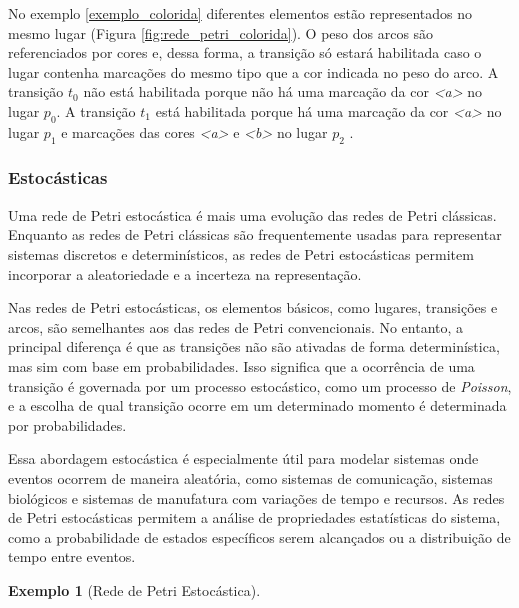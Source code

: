 \documentclass[
	12pt,				%
	openright,			%
	oneside,			%
	a4paper,			%
	english,			%
	brazil				%
	]{abntex2}
\theoremstyle{doispontos}
\newtheorem{exemplo}{Exemplo}
\begin{document}
No exemplo \ref{exemplo_colorida} diferentes elementos estão representados no mesmo lugar (Figura \ref{fig:rede_petri_colorida}). O peso dos arcos são referenciados por cores e, dessa forma, a transição só estará habilitada caso o lugar contenha marcações do mesmo tipo que a cor indicada no peso do arco. A transição $t_{0}$ não está habilitada porque não há uma marcação da cor \textit{<a>} no lugar $p_{0}$. A transição $t_{1}$ está habilitada porque há uma marcação da cor \textit{<a>} no lugar $p_{1}$ e marcações das cores \textit{<a>} e \textit{<b>} no lugar $p_{2}$ \textcite{inbook}.

\subsubsection{Estocásticas} \label{cap:redeEstocastica}

Uma rede de Petri estocástica é mais uma evolução das redes de Petri clássicas. Enquanto as redes de Petri clássicas são frequentemente usadas para representar sistemas discretos e determinísticos, as redes de Petri estocásticas permitem incorporar a aleatoriedade e a incerteza na representação.

Nas redes de Petri estocásticas, os elementos básicos, como lugares, transições e arcos, são semelhantes aos das redes de Petri convencionais. No entanto, a principal diferença é que as transições não são ativadas de forma determinística, mas sim com base em probabilidades. Isso significa que a ocorrência de uma transição é governada por um processo estocástico, como um processo de \textit{Poisson}, e a escolha de qual transição ocorre em um determinado momento é determinada por probabilidades.

Essa abordagem estocástica é especialmente útil para modelar sistemas onde eventos ocorrem de maneira aleatória, como sistemas de comunicação, sistemas biológicos e sistemas de manufatura com variações de tempo e recursos. As redes de Petri estocásticas permitem a análise de propriedades estatísticas do sistema, como a probabilidade de estados específicos serem alcançados ou a distribuição de tempo entre eventos.

\newpage
\begin{exemplo} [Rede de Petri Estocástica]
\label{exemplo_estocastica}
\end{exemplo}
\end{document}
